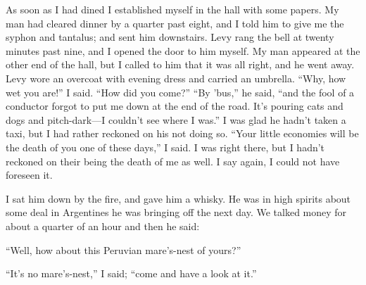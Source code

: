 As soon as I had dined I established myself in the hall with some papers. My man had cleared dinner by a quarter past eight, and I told him to give me the syphon and tantalus; and sent him downstairs. Levy rang the bell at twenty minutes past nine, and I opened the door to him myself. My man appeared at the other end of the hall, but I called to him that it was all right, and he went away. Levy wore an overcoat with evening dress and carried an umbrella. \enquote{Why, how wet you are!} I said. \enquote{How did you come?} \enquote{By ’bus,} he said, \enquote{and the fool of a conductor forgot to put me down at the end of the road. It’s pouring cats and dogs and pitch-dark\allowbreak---\allowbreak I couldn’t see where I was.} I was glad he hadn’t taken a taxi, but I had rather reckoned on his not doing so. \enquote{Your little economies will be the death of you one of these days,} I said. I was right there, but I hadn’t reckoned on their being the death of me as well. I say again, I could not have foreseen it.

I sat him down by the fire, and gave him a whisky. He was in high spirits about some deal in Argentines he was bringing off the next day. We talked money for about a quarter of an hour and then he said:

\enquote{Well, how about this Peruvian mare’s-nest of yours?}

\enquote{It’s no mare’s-nest,} I said; \enquote{come and have a look at it.}

